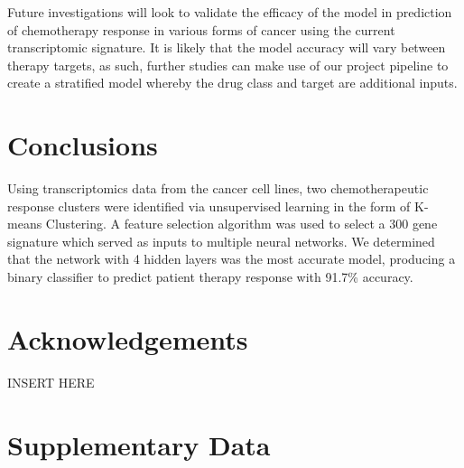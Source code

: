 \documentclass[10pt, letterpaper]{article}
\begin{document}
\begin{multicols}{2}
Future investigations will look to validate the efficacy of the model in prediction of chemotherapy response in various forms of cancer using the current transcriptomic signature. It is likely that the model accuracy will vary between therapy targets, as such, further studies can make use of our project pipeline to create a stratified model whereby the drug class and target are additional inputs.



\section*{Conclusions}
Using transcriptomics data from the cancer cell lines, two chemotherapeutic response clusters were identified via unsupervised learning in the form of K-means Clustering. A feature selection algorithm was used to select a 300 gene signature which served as inputs to multiple neural networks. We determined that the network with 4 hidden layers was the most accurate model, producing a binary classifier to predict patient therapy response with 91.7\% accuracy.


\section*{Acknowledgements}
INSERT HERE




\end{multicols}



\clearpage

\section*{Supplementary Data}
\end{document}
